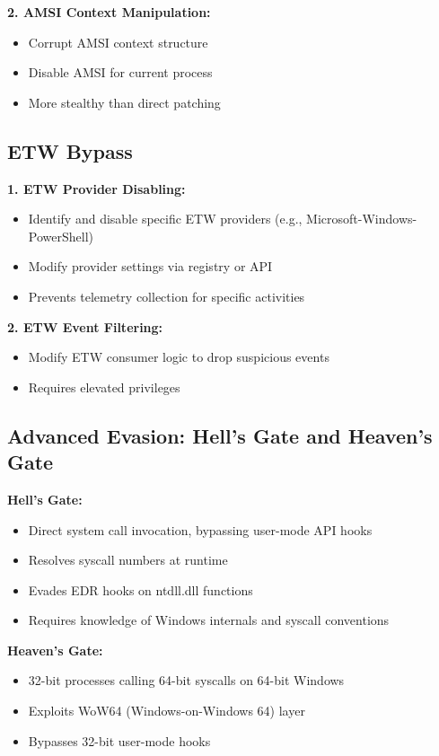 \documentclass[11pt,conference]{IEEEtran}
\begin{document}
\textbf{2. AMSI Context Manipulation:}
\begin{itemize}
    \item Corrupt AMSI context structure
    \item Disable AMSI for current process
    \item More stealthy than direct patching
\end{itemize}

\subsection{ETW Bypass}

\textbf{1. ETW Provider Disabling:}
\begin{itemize}
    \item Identify and disable specific ETW providers (e.g., Microsoft-Windows-PowerShell)
    \item Modify provider settings via registry or API
    \item Prevents telemetry collection for specific activities
\end{itemize}

\textbf{2. ETW Event Filtering:}
\begin{itemize}
    \item Modify ETW consumer logic to drop suspicious events
    \item Requires elevated privileges
\end{itemize}

\subsection{Advanced Evasion: Hell's Gate and Heaven's Gate}

\textbf{Hell's Gate:}
\begin{itemize}
    \item Direct system call invocation, bypassing user-mode API hooks
    \item Resolves syscall numbers at runtime
    \item Evades EDR hooks on ntdll.dll functions
    \item Requires knowledge of Windows internals and syscall conventions
\end{itemize}

\textbf{Heaven's Gate:}
\begin{itemize}
    \item 32-bit processes calling 64-bit syscalls on 64-bit Windows
    \item Exploits WoW64 (Windows-on-Windows 64) layer
    \item Bypasses 32-bit user-mode hooks
\end{itemize}
\end{document}

